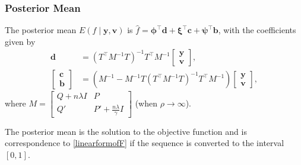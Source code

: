 \documentclass{beamer}
\begin{document}
\begin{frame}
\frametitle{Posterior Mean}


The posterior mean $E(f \mid \mathbf{y},\mathbf{v})$ is $\hat{f}  = \mathbf{\phi}^\top \mathbf{d}+\mathbf{\xi}^\top \mathbf{c}+\mathbf{\psi}^\top \mathbf{b}$, with the coefficients given by
\begin{align} 
\mathbf{d}&=\left(T^\top M^{-1}T\right)^{-1}T^\top M^{-1}\begin{bmatrix}\mathbf{y} \\ \mathbf{v} \end{bmatrix},\\
\begin{bmatrix}\mathbf{c}\\ \mathbf{b}\end{bmatrix} &=
\left(M^{-1}-M^{-1}T\left(T^\top M^{-1} T\right)^{-1}T^\top M^{-1}\right)\begin{bmatrix}\mathbf{y}\\ \mathbf{v} \end{bmatrix},
\end{align} 
where $M=\begin{bmatrix} Q+n\lambda I& P\\ Q'& P'+\frac{n\lambda}{\gamma}I \end{bmatrix}$ (when $\rho\rightarrow \infty$).

The posterior mean is the solution to the objective function and is correspondence to \eqref{linearformofF} if the sequence is converted to the interval $[0,1]$. 

\end{frame}


\end{document}
